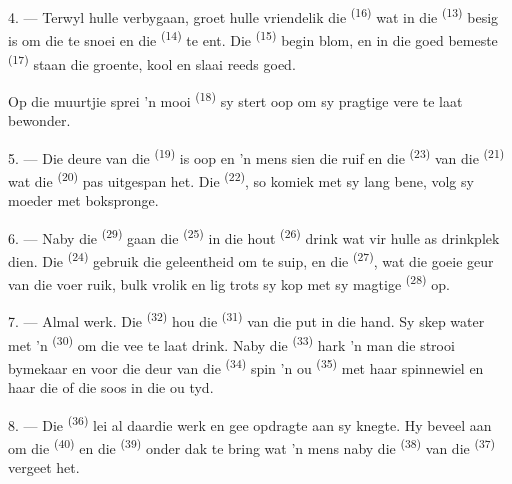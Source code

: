 4. --- Terwyl hulle verbygaan, groet hulle vriendelik die 
\textsuperscript{(16)} wat in die  \textsuperscript{(13)} besig is om die
 te snoei en die  \textsuperscript{(14)} te ent. Die
 \textsuperscript{(15)} begin blom, en in die goed bemeste
 \textsuperscript{(17)} staan die groente, kool en slaai reeds goed.

Op die muurtjie sprei 'n mooi  \textsuperscript{(18)} sy stert oop om sy
pragtige vere te laat bewonder.

\VUsaut{3.0mm}

5. --- Die deure van die  \textsuperscript{(19)} is oop en 'n mens sien die
ruif en die  \textsuperscript{(23)} van die 
\textsuperscript{(21)} wat die  \textsuperscript{(20)} pas uitgespan
het. Die  \textsuperscript{(22)}, so komiek met sy lang bene, volg sy
moeder met bokspronge.

6. --- Naby die  \textsuperscript{(29)} gaan die 
\textsuperscript{(25)} in die hout  \textsuperscript{(26)} drink wat vir
hulle as drinkplek dien. Die  \textsuperscript{(24)} gebruik die
geleentheid om te suip, en die  \textsuperscript{(27)}, wat die goeie geur
van die voer ruik, bulk vrolik en lig trots sy kop met sy magtige 
\textsuperscript{(28)} op.

7. --- Almal werk. Die  \textsuperscript{(32)} hou die 
\textsuperscript{(31)} van die put in die hand. Sy skep water met 'n 
\textsuperscript{(30)} om die vee te laat drink. Naby die 
\textsuperscript{(33)} hark 'n man die strooi bymekaar en voor die deur van die
 \textsuperscript{(34)} spin 'n ou 
\textsuperscript{(35)} met haar spinnewiel en haar  die  of
die  soos in die ou tyd.

\VUsaut{3.0mm}
\VUsaut{3.0mm}

8. --- Die  \textsuperscript{(36)} lei al daardie werk en gee opdragte aan
sy knegte. Hy beveel aan om die  \textsuperscript{(40)} en die 
\textsuperscript{(39)} onder dak te bring wat 'n mens naby die 
\textsuperscript{(38)} van die  \textsuperscript{(37)} vergeet het.

